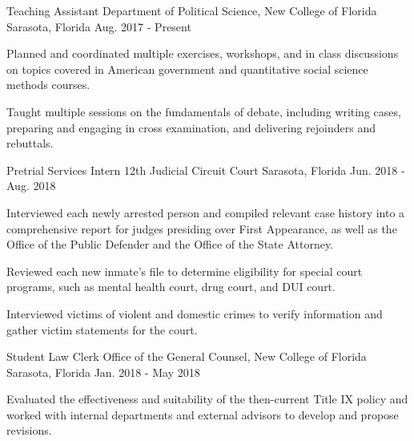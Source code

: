 

\begin{cventries}


    \cventry
      {Teaching Assistant} %
      {Department of Political Science, New College of Florida} %
      {Sarasota, Florida} %
      {Aug. 2017 - Present} %
      {
        \begin{cvitems} %
          \item {Planned and coordinated multiple exercises, workshops, and in class discussions on topics covered in American government and quantitative social science methods courses.}
          \item {Taught multiple sessions on the fundamentals of debate, including writing cases, preparing and engaging in cross examination, and delivering rejoinders and rebuttals.}
        \end{cvitems}
      }

  \cventry
    {Pretrial Services Intern} %
    {12th Judicial Circuit Court} %
    {Sarasota, Florida} %
    {Jun. 2018 - Aug. 2018} %
    {
      \begin{cvitems} %
        \item {Interviewed each newly arrested person and compiled relevant case history into a comprehensive report for judges presiding over First Appearance, as well as the Office of the Public Defender and the Office of the State Attorney.}
        \item {Reviewed each new inmate’s file to determine eligibility for special court programs, such as mental health court, drug court, and DUI court.}
        \item {Interviewed victims of violent and domestic crimes to verify information and gather victim statements for the court.}
      \end{cvitems}
    }

  \cventry
    {Student Law Clerk} %
    {Office of the General Counsel, New College of Florida} %
    {Sarasota, Florida} %
    {Jan. 2018 - May 2018} %
    {
      \begin{cvitems} %
        \item {Evaluated the effectiveness and suitability of the then-current Title IX policy and worked with internal departments and external advisors to develop and propose revisions.}
      \end{cvitems}
    }


\end{cventries}
